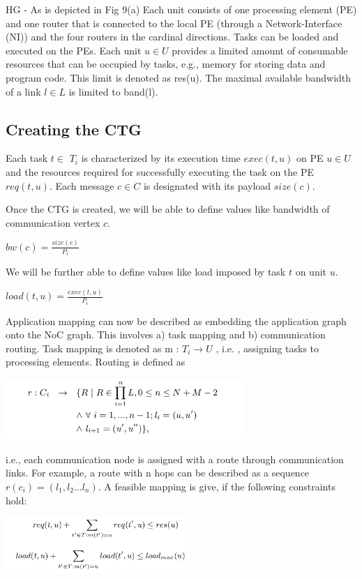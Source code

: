 HG - As is depicted in Fig 9(a) Each unit consists of one processing
element (PE) and one router that is connected to the local PE (through
a Network-Interface (NI)) and the four routers in the cardinal directions.
Tasks can be loaded and executed on the PEs. Each unit $u\in U$ provides
a limited amount of consumable resources that can be occupied by tasks,
e.g., memory for storing data and program code. This limit is denoted
as res(u). The maximal available bandwidth of a link $l\in L$ is
limited to band(l). 


\subsection{Creating the CTG}

Each task $t$$\in$ $T_{i}$ is characterized by its execution time
$exec(t,u)$ on PE $u\in U$ and the resources required for successfully
executing the task on the PE $req(t,u)$. Each message $c\in C$ is
designated with its payload $size(c)$. 

Once the CTG is created, we will be able to define values like bandwidth
of communication vertex $c$. 

$bw(c)=\frac{size(c)}{P_{i}}$

We will be further able to define values like load imposed by task
$t$ on unit $u$. 

$load(t,u)=\frac{exec(t,u)}{P_{i}}$

Application mapping can now be described as embedding the application
graph onto the NoC graph. This involves a) task mapping and b) communication
routing. Task mapping is denoted as m : $T_{i}$$\rightarrow U$ ,
i.e. , assigning tasks to processing elements. Routing is defined
as 

\includegraphics[width=9cm]{images/8}

i.e., each communication node is assigned with a route through communication
links. For example, a route with n hops can be described as a sequence
$r(c_{i})=(l_{1},l_{2}...l_{n})$. A feasible mapping is give, if
the following constraints hold:

\includegraphics[width=7cm]{images/9}

